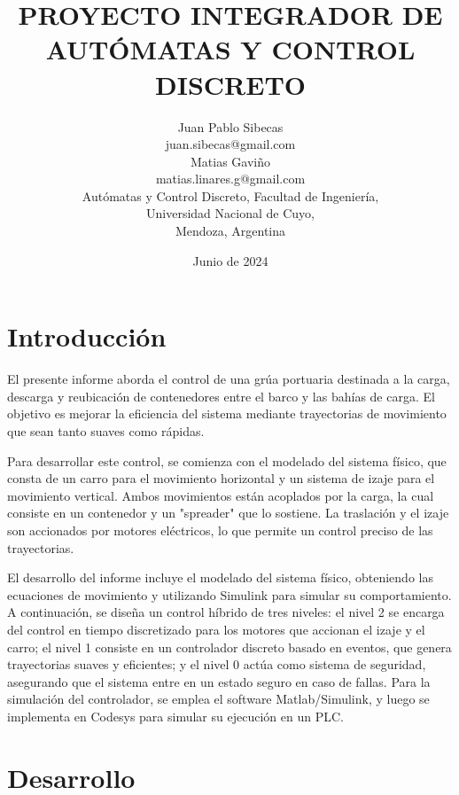 \documentclass{article}
\title{PROYECTO INTEGRADOR DE AUTÓMATAS Y CONTROL DISCRETO}
\author{Juan Pablo Sibecas \\ juan.sibecas@gmail.com \\Matias Gaviño\\ matias.linares.g@gmail.com \\ Autómatas y Control Discreto, Facultad de Ingeniería, \\ Universidad Nacional de Cuyo, \\ Mendoza, Argentina}
\date{Junio de 2024}
\begin{document}
\renewcommand{\tablename}{Tabla}

\maketitle

\begin{abstract}\label{sec:abstract}

\end{abstract}

\newpage

\section{Introducción} \label{sec:intro}


El presente informe aborda el control de una grúa portuaria destinada a la carga, descarga y reubicación de contenedores entre el barco y las bahías de carga. El objetivo es mejorar la eficiencia del sistema mediante trayectorias de movimiento que sean tanto suaves como rápidas.

Para desarrollar este control, se comienza con el modelado del sistema físico, que consta de un carro para el movimiento horizontal y un sistema de izaje para el movimiento vertical. Ambos movimientos están acoplados por la carga, la cual consiste en un contenedor y un "spreader" que lo sostiene. La traslación y el izaje son accionados por motores eléctricos, lo que permite un control preciso de las trayectorias.

El desarrollo del informe incluye el modelado del sistema físico, obteniendo las ecuaciones de movimiento y utilizando Simulink para simular su comportamiento. A continuación, se diseña un control híbrido de tres niveles: el nivel 2 se encarga del control en tiempo discretizado para los motores que accionan el izaje y el carro; el nivel 1 consiste en un controlador discreto basado en eventos, que genera trayectorias suaves y eficientes; y el nivel 0 actúa como sistema de seguridad, asegurando que el sistema entre en un estado seguro en caso de fallas. Para la simulación del controlador, se emplea el software Matlab/Simulink, y luego se implementa en Codesys para simular su ejecución en un PLC.


\section{Desarrollo} \label{sec:desarrollo}
\end{document}
